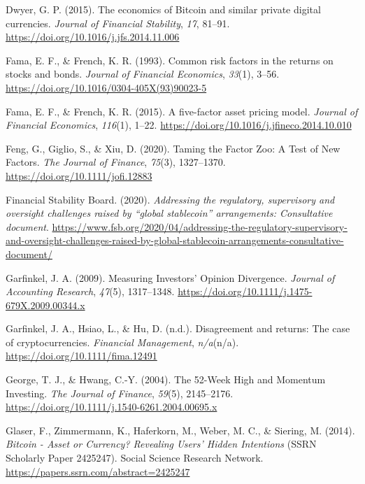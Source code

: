 \documentclass[
  12pt,
  a4paper,
  openany]{scrbook}
\newlength{\cslhangindent}
\newenvironment{CSLReferences}[2] %
 {\begin{list}{}{%
  \setlength{\itemindent}{0pt}
  \setlength{\leftmargin}{0pt}
  \setlength{\parsep}{0pt}
  \ifodd #1
   \setlength{\leftmargin}{\cslhangindent}
   \setlength{\itemindent}{-1\cslhangindent}
  \fi
  \setlength{\itemsep}{#2\baselineskip}}}
 {\end{list}}
\begin{document}
\begin{CSLReferences}{1}{0}
Dwyer, G. P. (2015). The economics of Bitcoin and similar private
digital currencies. \emph{Journal of Financial Stability}, \emph{17},
81--91. \url{https://doi.org/10.1016/j.jfs.2014.11.006}

Fama, E. F., \& French, K. R. (1993). Common risk factors in the returns
on stocks and bonds. \emph{Journal of Financial Economics},
\emph{33}(1), 3--56. \url{https://doi.org/10.1016/0304-405X(93)90023-5}

Fama, E. F., \& French, K. R. (2015). A five-factor asset pricing model.
\emph{Journal of Financial Economics}, \emph{116}(1), 1--22.
\url{https://doi.org/10.1016/j.jfineco.2014.10.010}

Feng, G., Giglio, S., \& Xiu, D. (2020). Taming the Factor Zoo: A Test
of New Factors. \emph{The Journal of Finance}, \emph{75}(3), 1327--1370.
\url{https://doi.org/10.1111/jofi.12883}

Financial Stability Board. (2020). \emph{Addressing the regulatory,
supervisory and oversight challenges raised by {``global stablecoin''}
arrangements: Consultative document}.
\url{https://www.fsb.org/2020/04/addressing-the-regulatory-supervisory-and-oversight-challenges-raised-by-global-stablecoin-arrangements-consultative-document/}

Garfinkel, J. A. (2009). Measuring Investors' Opinion Divergence.
\emph{Journal of Accounting Research}, \emph{47}(5), 1317--1348.
\url{https://doi.org/10.1111/j.1475-679X.2009.00344.x}

Garfinkel, J. A., Hsiao, L., \& Hu, D. (n.d.). Disagreement and returns:
The case of cryptocurrencies. \emph{Financial Management},
\emph{n/a}(n/a). \url{https://doi.org/10.1111/fima.12491}

George, T. J., \& Hwang, C.-Y. (2004). The 52-Week High and Momentum
Investing. \emph{The Journal of Finance}, \emph{59}(5), 2145--2176.
\url{https://doi.org/10.1111/j.1540-6261.2004.00695.x}

Glaser, F., Zimmermann, K., Haferkorn, M., Weber, M. C., \& Siering, M.
(2014). \emph{Bitcoin - Asset or Currency? Revealing Users' Hidden
Intentions} (SSRN Scholarly Paper 2425247). Social Science Research
Network. \url{https://papers.ssrn.com/abstract=2425247}


\end{CSLReferences}
\end{document}
